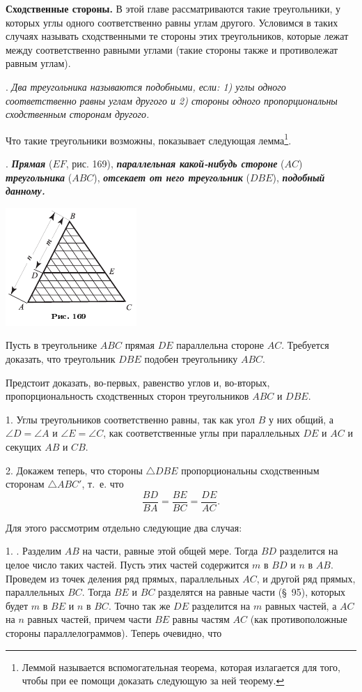 \documentclass[oneside]{book}
\begin{document}
\textbf{Сходственные стороны.} %
В этой главе рассматриваются такие треугольники, у которых углы одного соответственно равны углам другого.
Условимся в таких случаях называть сходственными те стороны этих треугольников, которые лежат между соответственно равными углами (такие стороны также и противолежат равным углам).

.
\emph{Два треугольника называются подобными, если:
1) углы одного соответственно равны углам другого и 2) стороны одного пропорциональны сходственным сторонам другого.}

Что такие треугольники возможны, показывает следующая лемма\footnote{Леммой называется вспомогательная теорема, которая излагается для того, чтобы при ее помощи доказать следующую за ней теорему.}.

.
\textbf{\emph{Прямая}} ($EF$, рис. 169), \textbf{\emph{параллельная какой-нибудь стороне}} ($AC$) \textbf{\emph{треугольника}} ($ABC$), \textbf{\emph{отсекает от него треугольник}} ($DBE$), \textbf{\emph{подобный данному.}}

\includegraphics{pics/ris-169}

Пусть в треугольнике $ABC$ прямая $DE$ параллельна стороне $AC$.
Требуется доказать, что треугольник $DBE$ подобен треугольнику $ABC$.

Предстоит доказать, во-первых, равенство углов и, во-вторых, пропорциональность сходственных сторон треугольников $ABC$ и $DBE$.

1.
Углы треугольников соответственно равны, так как угол $B$ у них общий, а $\angle D = \angle A$ и $\angle E= \angle C$, как соответственные углы при параллельных $DE$ и $AC$ и секущих $AB$ и $CB$.

2.
Докажем теперь, что стороны $\triangle DBE$ пропорциональны сходственным сторонам $\triangle ABC'$, т.~е. что
\[\frac{BD}{BA}=\frac{BE}{BC}=\frac{DE}{AC}.\]

Для этого рассмотрим отдельно следующие два случая:

1.
.
Разделим $AB$ на части, равные этой общей мере.
Тогда $BD$ разделится на целое число таких частей.
Пусть этих частей содержится $m$ в $BD$ и $n$ в $AB$.
Проведем из точек деления ряд прямых, параллельных $AC$, и другой ряд прямых, параллельных $BC$.
Тогда $BE$ и $BC$ разделятся на равные части (§~95), которых будет $m$ в $BE$ и $n$ в $BC$.
Точно так же $DE$ разделится на $m$ равных частей, а $AC$ на $n$ равных частей, причем части $BE$ равны частям $AC$ (как противоположные стороны параллелограммов).
Теперь очевидно, что
\end{document}
